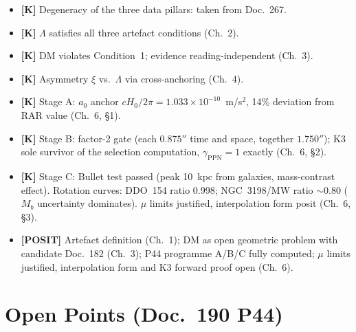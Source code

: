 \begin{itemize}
  \item \textbf{[K]} Degeneracy of the three data pillars: taken from
        Doc.~267.
  \item \textbf{[K]} $\Lambda$ satisfies all three artefact conditions
        (Ch.~2).
  \item \textbf{[K]} DM violates Condition~1; evidence reading-independent
        (Ch.~3).
  \item \textbf{[K]} Asymmetry $\xi$ vs.\ $\Lambda$ via cross-anchoring
        (Ch.~4).
  \item \textbf{[K]} Stage A: $a_0$ anchor $cH_0/2\pi =
        1.033\times10^{-10}$~m/s$^2$, 14\% deviation from RAR value
        (Ch.~6, §1).
  \item \textbf{[K]} Stage B: factor-2 gate (each $0.875''$ time and
        space, together $1.750''$); K3 sole survivor of the selection
        computation, $\gamma_\text{PPN}=1$ exactly (Ch.~6, §2).
  \item \textbf{[K]} Stage C: Bullet test passed (peak 10~kpc from
        galaxies, mass-contrast effect). Rotation curves: DDO~154 ratio
        0.998; NGC~3198/MW ratio $\sim$0.80 ($M_b$ uncertainty dominates).
        $\mu$ limits justified, interpolation form posit (Ch.~6, §3).
  \item \textbf{[POSIT]} Artefact definition (Ch.~1); DM as open
        geometric problem with candidate Doc.~182 (Ch.~3); P44 programme
        A/B/C fully computed; $\mu$ limits justified, interpolation form
        and K3 forward proof open (Ch.~6).
\end{itemize}

\chapter{Open Points (Doc.~190 P44)}

